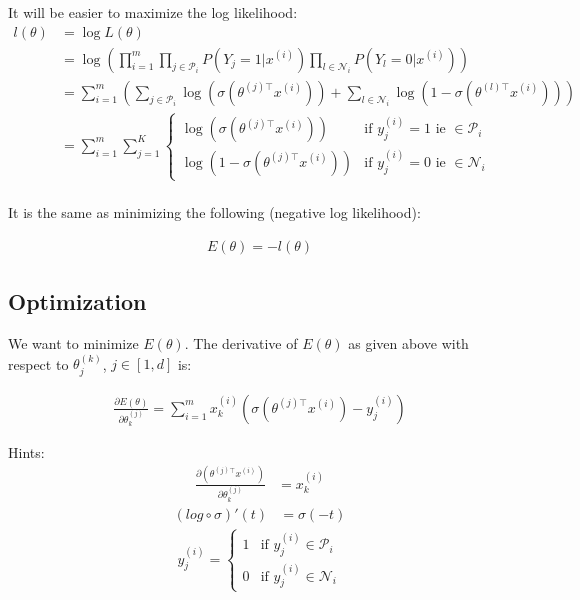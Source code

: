 It will be easier to maximize the log likelihood:
\begin{align}
	l(\theta) &= \log L(\theta) \\
			  &= \log \left( \prod_{i=1}^m  \prod_{j \in \mathcal{P}_i } P(Y_j=1 | x^{(i)}) \prod_{l \in \mathcal{N}_i} P(Y_l=0 | x^{(i)}) \right) \\
			  &= \sum_{i=1}^m \left( \sum_{j \in \mathcal{P}_i } \log (\sigma(\theta^{(j)\top} x^{(i)})) + \sum_{l \in \mathcal{N}_i} \log (1 - \sigma(\theta^{(l)\top} x^{(i)})) \right) \\
  			  &= \sum_{i=1}^m \sum_{j=1}^K
  			  	\left\{
				    \begin{array}{ll}
				        \log (\sigma(\theta^{(j)\top} x^{(i)})) & \mbox{if } y_j^{(i)} =1 \mbox{ ie }\in \mathcal{P}_i\\
				        \log (1 - \sigma(\theta^{(j)\top} x^{(i)})) & \mbox{if } y_j^{(i)} =0 \mbox{ ie } \in \mathcal{N}_i
				    \end{array}
				\right. \\
\end{align}


It is the same as minimizing the following (negative log likelihood):

\begin{align} 
	E(\theta) = -l(\theta)
\end{align}

\subsection*{Optimization}

We want to minimize $E(\theta)$. The derivative of $E(\theta)$ as given above with respect to $\theta_j^{(k)}$, $j \in [1,d]$ is:

\begin{align}
	\frac{\partial E(\theta)}{\partial \theta_k^{(j)}} = \sum_{i=1}^m x^{(i)}_k (\sigma(\theta^{(j)\top} x^{(i)}) - y_j^{(i)})
\end{align}

Hints:
\begin{align}
	\frac{\partial (\theta^{(j)\top} x^{(i)}) }{\partial \theta_k^{(j)}}  &= x_k^{(i)} 
\end{align}
\begin{align}
	(log \circ \sigma)'(t) &= \sigma(-t)
\end{align}
\begin{align}
y_j^{(i)} = 
	\left\{
	    \begin{array}{ll}
	        1 & \mbox{if } y_j^{(i)} \in \mathcal{P}_i\\
	        0 & \mbox{if } y_j^{(i)} \in \mathcal{N}_i
	    \end{array}
	\right.
\end{align}

